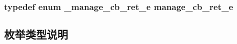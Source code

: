 \subsubsection[{manage\+\_\+cb\+\_\+ret\+\_\+e}]{\setlength{\rightskip}{0pt plus 5cm}typedef enum {\bf \+\_\+manage\+\_\+cb\+\_\+ret\+\_\+e}  {\bf manage\+\_\+cb\+\_\+ret\+\_\+e}}\label{a00066_a8c9e6cb76465f1f73326c74c03f5fc8f_a8c9e6cb76465f1f73326c74c03f5fc8f}


\subsection{枚举类型说明}
\hypertarget{a00066_a2217ac7363dbae279d056a361d122915_a2217ac7363dbae279d056a361d122915}{}
